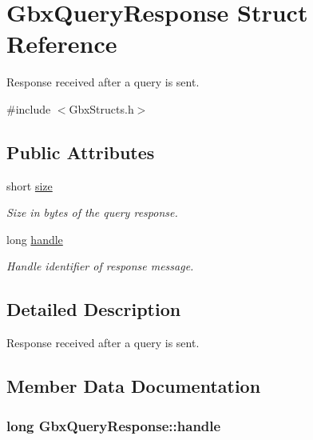 \hypertarget{structGbxQueryResponse}{\section{Gbx\-Query\-Response Struct Reference}
\label{structGbxQueryResponse}
}


Response received after a query is sent.  




{\ttfamily \#include $<$Gbx\-Structs.\-h$>$}

\subsection*{Public Attributes}
\begin{DoxyCompactItemize}
\item 
short \hyperlink{structGbxQueryResponse_ab7d7e30d6beb443cdae8cbf95e4c89f3}{size}
\begin{DoxyCompactList}\small\item\em Size in bytes of the query response. \end{DoxyCompactList}\item 
long \hyperlink{structGbxQueryResponse_ad37f7d084a89880263a2a36287427af3}{handle}
\begin{DoxyCompactList}\small\item\em Handle identifier of response message. \end{DoxyCompactList}\end{DoxyCompactItemize}


\subsection{Detailed Description}
Response received after a query is sent. 

\subsection{Member Data Documentation}
\hypertarget{structGbxQueryResponse_ad37f7d084a89880263a2a36287427af3}{
\subsubsection[{handle}]{\setlength{\rightskip}{0pt plus 5cm}long Gbx\-Query\-Response\-::handle}}\label{structGbxQueryResponse_ad37f7d084a89880263a2a36287427af3}


